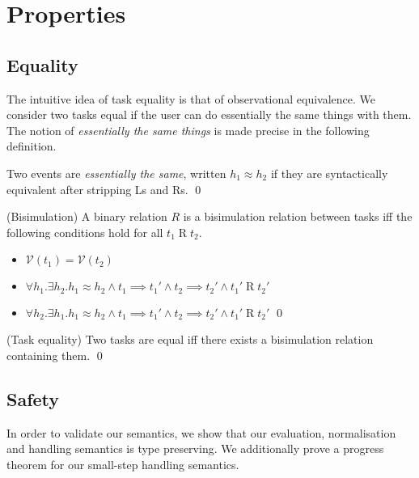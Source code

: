 
\section{Properties}

\subsection{Equality}

The intuitive idea of task equality is that of observational equivalence.
We consider two tasks equal if the user can do essentially the same things with them.
The notion of \emph{essentially the same things} is made precise in the following definition.

\begin{definition}
Two events are \emph{essentially the same}, written $h_1 \approx h_2$ if they are syntactically equivalent after stripping Ls and Rs. \qed
\end{definition}

\begin{definition}
(Bisimulation) A binary relation $R$ is a bisimulation relation between tasks iff the following conditions hold for all $t_1 \mathrel{R} t_2$.
\begin{itemize}
\item $\mathcal{V}(t_1) = \mathcal{V}(t_2)$
\item $\forall h_1 . \exists h_2 . h_1 \approx h_2 \wedge t_1 \implies t_1' \wedge t_2 \implies t_2' \wedge t_1' \mathrel{R} t_2'$
\item $\forall h_2 . \exists h_1 . h_1 \approx h_2 \wedge t_1 \implies t_1' \wedge t_2 \implies t_2' \wedge t_1' \mathrel{R} t_2'$ \qed
\end{itemize}
\end{definition}

\begin{definition}
(Task equality) Two tasks are equal iff there exists a bisimulation relation containing them. \qed
\end{definition}

\subsection{Safety}

In order to validate our semantics, we show that our evaluation, normalisation
and handling semantics is type preserving. We additionally prove a progress
theorem for our small-step handling semantics.

